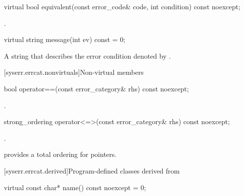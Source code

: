 %
\begin{itemdecl}
virtual bool equivalent(const error_code& code, int condition) const noexcept;
\end{itemdecl}

\begin{itemdescr}
\pnum
\returns
{}.
\end{itemdescr}

%
\begin{itemdecl}
virtual string message(int ev) const = 0;
\end{itemdecl}

\begin{itemdescr}
\pnum
\returns
A string that describes the error condition denoted by .
\end{itemdescr}

[syserr.errcat.nonvirtuals]{Non-virtual members}

%
\begin{itemdecl}
bool operator==(const error_category& rhs) const noexcept;
\end{itemdecl}

\begin{itemdescr}
\pnum
\returns
{}.
\end{itemdescr}

%
\begin{itemdecl}
strong_ordering operator<=>(const error_category& rhs) const noexcept;
\end{itemdecl}

\begin{itemdescr}
\pnum
\returns
{}.

\begin{note}
 provides a total ordering for pointers.
\end{note}
\end{itemdescr}

[syserr.errcat.derived]{Program-defined classes derived from }

%
\begin{itemdecl}
virtual const char* name() const noexcept = 0;
\end{itemdecl}

